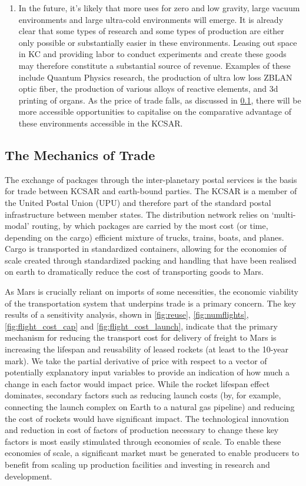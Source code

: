 \documentclass[fleqn,10pt]{Stylesheet} %
\begin{document}
\begin{enumerate}
\item In the future, it’s likely that more uses for zero and low gravity, large  vacuum environments and large ultra-cold environments will emerge. It is already clear that some types of research and some types of production are either only possible or substantially easier in these environments. Leasing out space in KC and providing labor to conduct experiments and create these goods may therefore constitute a substantial source of revenue. Examples of these include Quantum Physics research, the production of ultra low loss ZBLAN optic fiber\cite{Ingo2018}, the production of various alloys of reactive elements\cite{Russel2019}, and 3d printing of organs\cite{Boissonneault2019}.  As the price of trade falls, as discussed in \ref{sec:mechanics_trade}, there will be more accessible opportunities to capitalise on the comparative advantage of these environments accessible in the KCSAR.
\end{enumerate}

\subsection{The Mechanics of Trade}
\label{sec:mechanics_trade}
The exchange of packages through the inter-planetary postal services is the basis for trade between KCSAR and earth-bound parties. The KCSAR is a member of the United Postal Union (UPU) and therefore part of the standard postal infrastructure between member states. The distribution network relies on ‘multi-modal’ routing, by which packages are carried by the most cost (or time, depending on the cargo) efficient mixture of trucks, trains, boats, and planes. Cargo is transported in standardized containers, allowing for the economies of scale created through standardized packing and handling that have been realised on earth to dramatically reduce the cost of transporting goods to Mars. \cite{Levinson}

As Mars is crucially reliant on imports of some necessities, the economic viability of the transportation system that underpins trade is a primary concern. The key results of a sensitivity analysis, shown in \ref{fig:reuse}, \ref{fig:numflights}, \ref{fig:flight_cost_cap} and \ref{fig:flight_cost_launch}, indicate that the primary mechanism for reducing the transport cost for delivery of freight to Mars is increasing the lifespan and reusability of leased rockets (at least to the 10-year mark). We take the partial derivative of price with respect to a vector of potentially explanatory input variables to provide an indication of how much a change in each factor would impact price. While the rocket lifespan effect dominates, secondary factors such as reducing launch costs (by, for example, connecting the launch complex on Earth to a natural gas pipeline) and reducing the cost of rockets would have significant impact. The technological innovation and reduction in cost of factors of production necessary to change these key factors is most easily stimulated through economies of scale. To enable these economies of scale, a significant market must be generated to enable producers to benefit from scaling up production facilities and investing in research and development. 
\end{document}
